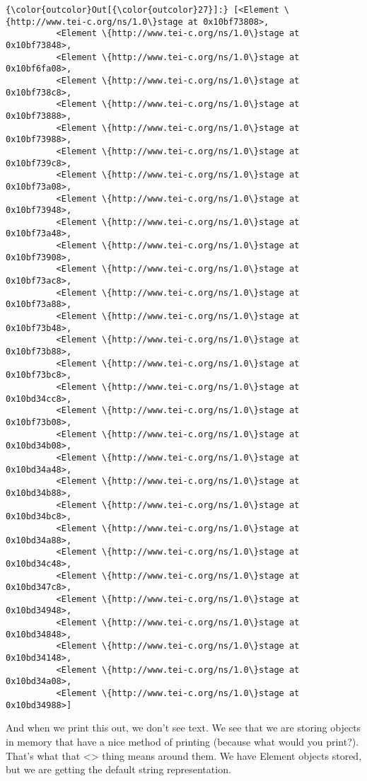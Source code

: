 \documentclass[11pt]{article}
\begin{document}
\begin{Verbatim}[commandchars=\\\{\}]
{\color{outcolor}Out[{\color{outcolor}27}]:} [<Element \{http://www.tei-c.org/ns/1.0\}stage at 0x10bf73808>,
          <Element \{http://www.tei-c.org/ns/1.0\}stage at 0x10bf73848>,
          <Element \{http://www.tei-c.org/ns/1.0\}stage at 0x10bf6fa08>,
          <Element \{http://www.tei-c.org/ns/1.0\}stage at 0x10bf738c8>,
          <Element \{http://www.tei-c.org/ns/1.0\}stage at 0x10bf73888>,
          <Element \{http://www.tei-c.org/ns/1.0\}stage at 0x10bf73988>,
          <Element \{http://www.tei-c.org/ns/1.0\}stage at 0x10bf739c8>,
          <Element \{http://www.tei-c.org/ns/1.0\}stage at 0x10bf73a08>,
          <Element \{http://www.tei-c.org/ns/1.0\}stage at 0x10bf73948>,
          <Element \{http://www.tei-c.org/ns/1.0\}stage at 0x10bf73a48>,
          <Element \{http://www.tei-c.org/ns/1.0\}stage at 0x10bf73908>,
          <Element \{http://www.tei-c.org/ns/1.0\}stage at 0x10bf73ac8>,
          <Element \{http://www.tei-c.org/ns/1.0\}stage at 0x10bf73a88>,
          <Element \{http://www.tei-c.org/ns/1.0\}stage at 0x10bf73b48>,
          <Element \{http://www.tei-c.org/ns/1.0\}stage at 0x10bf73b88>,
          <Element \{http://www.tei-c.org/ns/1.0\}stage at 0x10bf73bc8>,
          <Element \{http://www.tei-c.org/ns/1.0\}stage at 0x10bd34cc8>,
          <Element \{http://www.tei-c.org/ns/1.0\}stage at 0x10bf73b08>,
          <Element \{http://www.tei-c.org/ns/1.0\}stage at 0x10bd34b08>,
          <Element \{http://www.tei-c.org/ns/1.0\}stage at 0x10bd34a48>,
          <Element \{http://www.tei-c.org/ns/1.0\}stage at 0x10bd34b88>,
          <Element \{http://www.tei-c.org/ns/1.0\}stage at 0x10bd34bc8>,
          <Element \{http://www.tei-c.org/ns/1.0\}stage at 0x10bd34a88>,
          <Element \{http://www.tei-c.org/ns/1.0\}stage at 0x10bd34c48>,
          <Element \{http://www.tei-c.org/ns/1.0\}stage at 0x10bd347c8>,
          <Element \{http://www.tei-c.org/ns/1.0\}stage at 0x10bd34948>,
          <Element \{http://www.tei-c.org/ns/1.0\}stage at 0x10bd34848>,
          <Element \{http://www.tei-c.org/ns/1.0\}stage at 0x10bd34148>,
          <Element \{http://www.tei-c.org/ns/1.0\}stage at 0x10bd34a08>,
          <Element \{http://www.tei-c.org/ns/1.0\}stage at 0x10bd34988>]
\end{Verbatim}
            
    And when we print this out, we don't see text. We see that we are
storing objects in memory that have a nice method of printing (because
what would you print?). That's what that \textless{}\textgreater{} thing
means around them. We have Element objects stored, but we are getting
the default string representation.
\end{document}
